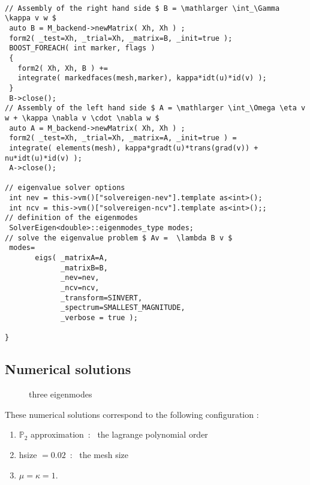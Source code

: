 \begin{lstlisting}

// Assembly of the right hand side $ B = \mathlarger \int_\Gamma \kappa v w $
 auto B = M_backend->newMatrix( Xh, Xh ) ;
 form2( _test=Xh, _trial=Xh, _matrix=B, _init=true );
 BOOST_FOREACH( int marker, flags )
 {
   form2( Xh, Xh, B ) +=
   integrate( markedfaces(mesh,marker), kappa*idt(u)*id(v) );
 }
 B->close();
// Assembly of the left hand side $ A = \mathlarger \int_\Omega \eta v w + \kappa \nabla v \cdot \nabla w $
 auto A = M_backend->newMatrix( Xh, Xh ) ;
 form2( _test=Xh, _trial=Xh, _matrix=A, _init=true ) =
 integrate( elements(mesh), kappa*gradt(u)*trans(grad(v)) + nu*idt(u)*id(v) );
 A->close();

// eigenvalue solver options
 int nev = this->vm()["solvereigen-nev"].template as<int>();
 int ncv = this->vm()["solvereigen-ncv"].template as<int>();;
// definition of the eigenmodes
 SolverEigen<double>::eigenmodes_type modes;
// solve the eigenvalue problem $ Av =  \lambda B v $
 modes=
       eigs( _matrixA=A,
             _matrixB=B,
             _nev=nev,
             _ncv=ncv,
             _transform=SINVERT,
             _spectrum=SMALLEST_MAGNITUDE,
             _verbose = true );

}

\end{lstlisting}

\subsection{Numerical solutions}
\label{sec:numerical-solutions-1}
\vspace{-17pt}
\begin{figure}[htbp]
  \centering
  \hspace{0.3cm}
  \hspace{0.3cm}
  \caption{three eigenmodes}
\label{fig:eigenvalues}
\end{figure}
These numerical solutions correspond to the following configuration :
\begin{enumerate}
\item $\mathbb P_2$ approximation~:~ the lagrange polynomial order
\item hsize $= 0.02$~:~ the mesh size
\item $\mu = \kappa = 1.$
\end{enumerate}
